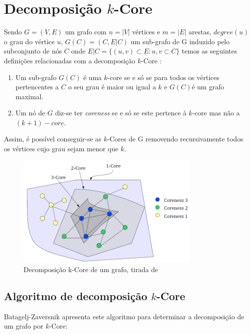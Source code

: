 \renewcommand{\algorithmicrequire}{\textbf{Dados: }}
\renewcommand{\algorithmicensure}{\textbf{Resultado: }}

\section{Decomposição \texorpdfstring{$k$}{k}-Core}



Sendo $G = (V,E)$ um grafo com $n = |V|$ vértices e $m = |E|$ arestas, $degree(u)$ o grau do vértice $u$, $G(C) = (C, E|C)$ um sub-grafo de G induzido pelo subconjunto de nós $C$ onde $E|C = \{(u,v)\subset E : u,v \subset C\} $ temos as seguintes definições relacionadas com a decomposição $k$-Core \cite{kCoreDef}:


	\begin{enumerate}
		\item Um sub-grafo $G(C)$ é uma $k$-core se e só se para todos os vértices pertencentes a $C$ o seu grau é maior ou igual a $k$ e $G(C)$é um grafo maximal.
		\item Um nó de $G$ diz-se ter \textit{coreness} se e só se este pertence à $k$-core mas não a $(k+1)-core$.
	\end{enumerate}


Assim, é possível conseguir-se as $k$-Cores de G removendo recursivamente todos os vértices cujo grau sejam menor que $k$.


\begin{figure}
\centering
\caption{Decomposição k-Core de um grafo, tirada de~\cite{kCoreDis}}
\includegraphics[width=90mm]{kCoreExample}
\end{figure}

\subsection{Algoritmo de decomposição \texorpdfstring{$k$}{k}-Core}
Batagelj-Zaversnik apresenta\cite{kCoreCen1,kCoreCen2} este algoritmo para determinar a decomposição de um grafo por $k$-Core:

